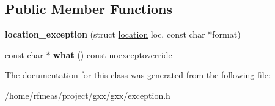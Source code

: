 \subsection*{Public Member Functions}
\begin{DoxyCompactItemize}
\item 
{\bfseries location\+\_\+exception} (struct \hyperlink{structlocation}{location} loc, const char $\ast$format)\hypertarget{classgxx_1_1location__exception_ae5b9b3c317ae28710429520c5ed8b021}{}\label{classgxx_1_1location__exception_ae5b9b3c317ae28710429520c5ed8b021}

\item 
const char $\ast$ {\bfseries what} () const noexceptoverride\hypertarget{classgxx_1_1location__exception_a2fb8a0c0bf24493cd3e466c772b50e10}{}\label{classgxx_1_1location__exception_a2fb8a0c0bf24493cd3e466c772b50e10}

\end{DoxyCompactItemize}


The documentation for this class was generated from the following file\+:\begin{DoxyCompactItemize}
\item 
/home/rfmeas/project/gxx/gxx/exception.\+h\end{DoxyCompactItemize}
